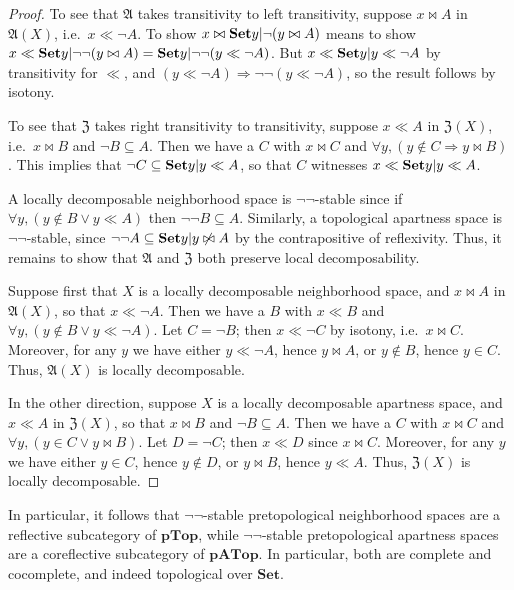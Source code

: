 \documentclass{article}
\def\cpl#1{\neg #1}
\let\implies\Rightarrow
\def\anti{\mathfrak{A}}
\def\neigh{\mathfrak{Z}}
\def\nn{\ensuremath{\neg\neg}}
\def\Set{\mathbf{Set}}
\def\PTop{\mathbf{pTop}}
\def\PATop{\mathbf{pATop}}
\def\PATopnn{\mathbf{pATop}_{\nn}}
\begin{document}
\begin{proof}
  To see that $\anti$ takes transitivity to left transitivity, suppose $x\bowtie A$ in $\anti(X)$, i.e.\ $x\ll \cpl{A}$.
  To show $x\bowtie \setof{y|\neg(y\bowtie A)}$ means to show $x\ll \setof{y|\neg\neg(y\bowtie A)} = \setof{y|\neg\neg(y\ll \cpl{A})}$.
  But $x\ll \setof{y|y\ll \cpl{A}}$ by transitivity for $\ll$, and $(y\ll \cpl{A})\implies\neg\neg(y\ll\cpl{A})$, so the result follows by isotony.

  To see that $\neigh$ takes right transitivity to transitivity, suppose $x\ll A$ in $\neigh(X)$, i.e.\ $x\bowtie B$ and $\cpl{B}\subseteq A$.
  Then we have a $C$ with $x\bowtie C$ and $\forall y, (y\notin C \implies y\bowtie B)$.
  This implies that $\cpl{C}\subseteq \setof{y | y\ll A}$, so that $C$ witnesses $x\ll \setof{y | y\ll A}$.

  A locally decomposable neighborhood space is \nn-stable since if $\forall y, (y\notin B \lor y \ll A)$ then $\neg\neg B \subseteq A$.
  Similarly, a topological apartness space is \nn-stable, since $\cpl{\cpl{A}}\subseteq \setof{ y | y \not\bowtie A }$ by the contrapositive of reflexivity.
  Thus, it remains to show that $\anti$ and $\neigh$ both preserve local decomposability.

  Suppose first that $X$ is a locally decomposable neighborhood space, and $x \bowtie A$ in $\anti(X)$, so that $x\ll \cpl{A}$.
  Then we have a $B$ with $x\ll B$ and $\forall y, (y\notin B \lor y\ll \cpl{A})$.
  Let $C = \cpl{B}$; then $x\ll \cpl{C}$ by isotony, i.e.\ $x\bowtie C$.
  Moreover, for any $y$ we have either $y\ll\cpl{A}$, hence $y\bowtie A$, or $y\notin B$, hence $y\in C$.
  Thus, $\anti(X)$ is locally decomposable.

  In the other direction, suppose $X$ is a locally decomposable apartness space, and $x\ll A$ in $\neigh(X)$, so that $x\bowtie B$ and $\cpl{B}\subseteq A$.
  Then we have a $C$ with $x\bowtie C$ and $\forall y, (y\in C \lor y\bowtie B)$.
  Let $D = \cpl{C}$; then $x\ll D$ since $x\bowtie C$.
  Moreover, for any $y$ we have either $y\in C$, hence $y\notin D$, or $y\bowtie B$, hence $y\ll A$.
  Thus, $\neigh(X)$ is locally decomposable.
\end{proof}

\begin{rmk}
  In particular, it follows that \nn-stable pretopological neighborhood spaces are a reflective subcategory of $\PTop$, while \nn-stable pretopological apartness spaces are a coreflective subcategory of $\PATop$.
  In particular, both are complete and cocomplete, and indeed topological over $\Set$.
\end{rmk}
\end{document}
